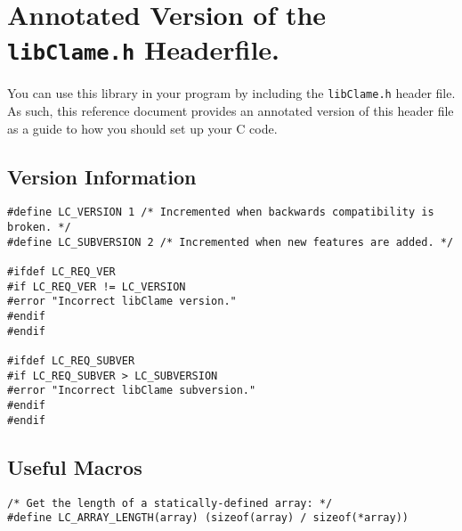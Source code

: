 %
%
%

\section{Annotated Version of the \texttt{libClame.h} Headerfile.}
\label{sec:libClame.h}

You can use this library in your program by including the \texttt{libClame.h} header file. As such, this reference document provides an annotated version of this header file as a guide to how you should set up your C code.

\subsection{Version Information}

\begin{verbatim}
#define LC_VERSION 1 /* Incremented when backwards compatibility is broken. */
#define LC_SUBVERSION 2 /* Incremented when new features are added. */

#ifdef LC_REQ_VER
#if LC_REQ_VER != LC_VERSION
#error "Incorrect libClame version."
#endif
#endif

#ifdef LC_REQ_SUBVER
#if LC_REQ_SUBVER > LC_SUBVERSION
#error "Incorrect libClame subversion."
#endif
#endif
\end{verbatim}

\subsection{Useful Macros}

\begin{verbatim}
/* Get the length of a statically-defined array: */
#define LC_ARRAY_LENGTH(array) (sizeof(array) / sizeof(*array))
\end{verbatim}


